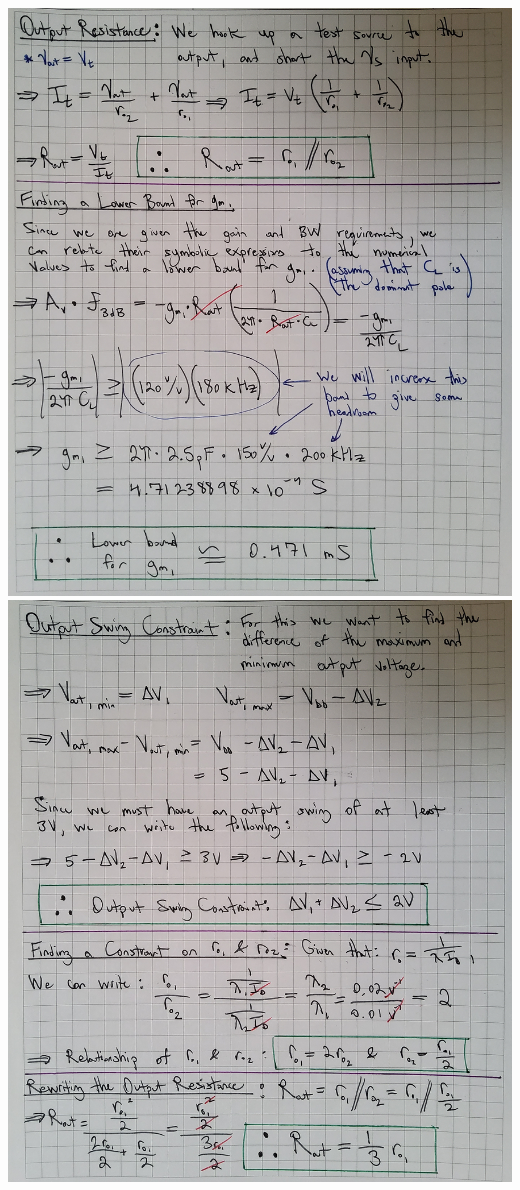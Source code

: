 \documentclass[12pt, fleqn]{article}
\begin{document}
\includegraphics[scale=0.165, angle=90, center]{p2a_2.jpg}\\
\newpage
\includegraphics[scale=0.165, angle=90, center]{p2a_3.jpg}\\
\end{document}
